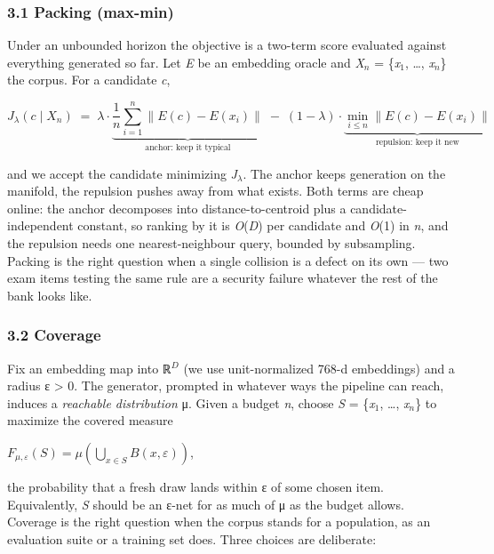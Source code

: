 \documentclass[
  10pt,
]{article}
\theoremstyle{plain}
\theoremstyle{definition}
\begin{document}
\subsubsection{3.1 Packing (max-min)}\label{31-packing-max-min}

Under an unbounded horizon the objective is a two-term score evaluated
against everything generated so far. Let \emph{E} be an embedding oracle
and \emph{X\(_{n}\)} = \{\emph{x}\(_{1}\), \ldots, \emph{x\(_{n}\)}\}
the corpus. For a candidate \emph{c},

\[
J_\lambda(c \mid X_n) \;=\; \lambda \cdot \underbrace{\frac{1}{n}\sum_{i=1}^{n}\lVert E(c) - E(x_i)\rVert}_{\text{anchor: keep it typical}} \;-\; (1-\lambda)\cdot \underbrace{\min_{i \le n} \lVert E(c) - E(x_i)\rVert}_{\text{repulsion: keep it new}}
\]

and we accept the candidate minimizing \emph{J}\(_{λ}\). The anchor
keeps generation on the manifold, the repulsion pushes away from what
exists. Both terms are cheap online: the anchor decomposes into
distance-to-centroid plus a candidate-independent constant, so ranking
by it is \emph{O}(\emph{D}) per candidate and \emph{O}(1) in \emph{n},
and the repulsion needs one nearest-neighbour query, bounded by
subsampling. Packing is the right question when a single collision is a
defect on its own --- two exam items testing the same rule are a
security failure whatever the rest of the bank looks like.

\subsubsection{3.2 Coverage}\label{32-coverage}

Fix an embedding map into ℝ\(^{D}\) (we use unit-normalized 768-d
embeddings) and a radius ε \textgreater{} 0. The generator, prompted in
whatever ways the pipeline can reach, induces a \emph{reachable
distribution} μ. Given a budget \emph{n}, choose \emph{S} =
\{\emph{x}\(_{1}\), \ldots, \emph{x\(_{n}\)}\} to maximize the covered
measure

\(F_{\mu,\varepsilon}(S) = \mu\!\left(\bigcup_{x \in S} B(x,\varepsilon)\right)\),

the probability that a fresh draw lands within ε of some chosen item.
Equivalently, \emph{S} should be an ε-net for as much of μ as the budget
allows. Coverage is the right question when the corpus stands for a
population, as an evaluation suite or a training set does. Three choices
are deliberate:
\end{document}
